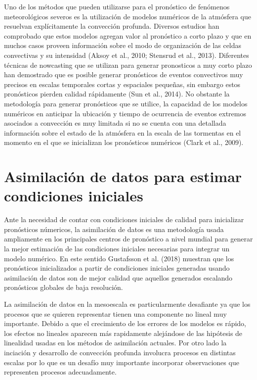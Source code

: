 \documentclass[12pt,oneside,a4paper]{reedthesis}
\begin{document}
Uno de los métodos que pueden utilizarse para el pronóstico de fenómenos meteorológicos severos es la utilización de modelos numéricos de la atmósfera que resuelvan explícitamente la convección profunda. Diversos estudios han comprobado que estos modelos agregan valor al pronóstico a corto plazo y que en muchos casos proveen información sobre el modo de organización de las celdas convectivas y su intensidad (Aksoy et al., 2010; Stensrud et al., 2013). Diferentes técnicas de nowcasting que se utilizan para generar pronosticos a muy corto plazo han demostrado que es posible generar pronósticos de eventos convectivos muy precisos en escalas temporales cortas y espaciales pequeñas, sin embargo estos pronósticos pierden calidad rápidamente (Sun et al., 2014). No obstante la metodología para generar pronósticos que se utilice, la capacidad de los modelos numéricos en anticipar la ubicación y tiempo de ocurrencia de eventos extremos asociados a convección es muy limitada si no se cuenta con una detallada información sobre el estado de la atmósfera en la escala de las tormentas en el momento en el que se inicializan los pronósticos numéricos (Clark et al., 2009).

\hypertarget{asimilaciuxf3n-de-datos-para-estimar-condiciones-iniciales}{%
\section{Asimilación de datos para estimar condiciones iniciales}\label{asimilaciuxf3n-de-datos-para-estimar-condiciones-iniciales}}

Ante la necesidad de contar con condiciones iniciales de calidad para inicializar pronósticos númericos, la asimilación de datos es una metodología usada ampliamente en los principales centros de pronóstico a nivel mundial para generar la mejor estimación de las condiciones iniciales necesarias para integrar un modelo numérico. En este sentido Gustafsson et al. (2018) muestran que los pronósticos inicializados a partir de condiciones iniciales generadas usando asimilación de datos son de mejor calidad que aquellos generados escalando pronósticos globales de baja resolución.

La asimilación de datos en la mesoescala es particularmente desafiante ya que los procesos que se quieren representar tienen una componente no lineal muy importante. Debido a que el crecimiento de los errores de los modelos es rápido, los efectos no lineales aparecen más rapidamente alejándose de las hipótesis de linealidad usadas en los métodos de asimilación actuales. Por otro lado la inciación y desarrollo de convección profunda involucra procesos en distintas escalas por lo que es un desafío muy importante incorporar observaciones que representen procesos adecuadamente.
\end{document}
